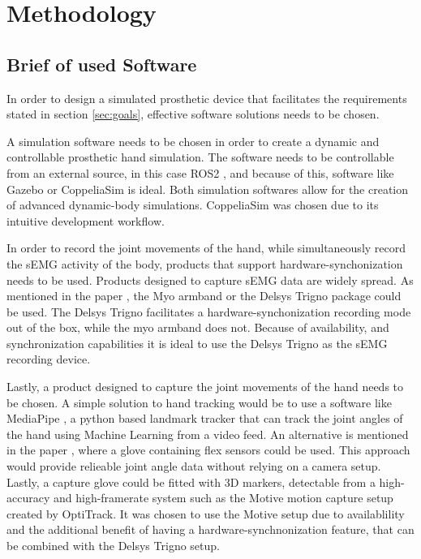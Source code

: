 \documentclass[../main.tex]{subfiles}
\begin{document}
\section{Methodology}

\subsection{Brief of used Software}
\label{sec:software}

In order to design a simulated prosthetic device that facilitates the requirements stated in section \ref{sec:goals}, effective software solutions needs to be chosen.

A simulation software needs to be chosen in order to create a dynamic and controllable prosthetic hand simulation.
The software needs to be controllable from an external source, in this case ROS2 \cite{ros2}, and because of this, software like Gazebo \cite{gazebo} or CoppeliaSim \cite{coppeliasim} is ideal.
Both simulation softwares allow for the creation of advanced dynamic-body simulations.
CoppeliaSim \cite{coppeliasim} was chosen due to its intuitive development workflow.

In order to record the joint movements of the hand, while simultaneously record the sEMG activity of the body, products that support hardware-synchonization needs to be used.
Products designed to capture sEMG data are widely spread.
As mentioned in the paper \cite{Zhaolong2021}, the Myo armband \cite{myo} or the Delsys Trigno package \cite{emgworks} could be used.
The Delsys Trigno \cite{emgworks} facilitates a hardware-synchonization recording mode out of the box, while the myo armband \cite{myo} does not.
Because of availability, and synchronization capabilities it is ideal to use the Delsys Trigno as the sEMG recording device.

Lastly, a product designed to capture the joint movements of the hand needs to be chosen.
A simple solution to hand tracking would be to use a software like MediaPipe \cite{mediapipe}, a python based landmark tracker that can track the joint angles of the hand using Machine Learning from a video feed.
An alternative is mentioned in the paper \cite{Zhaolong2021}, where a glove containing flex sensors could be used.
This approach would provide relieable joint angle data without relying on a camera setup.
Lastly, a capture glove could be fitted with 3D markers, detectable from a high-accuracy and high-framerate system such as the Motive motion capture setup \cite{optitrack} created by OptiTrack.
It was chosen to use the Motive setup due to availablility and the additional benefit of having a hardware-synchnonization feature, that can be combined with the Delsys Trigno \cite{emgworks} setup.
\end{document}
